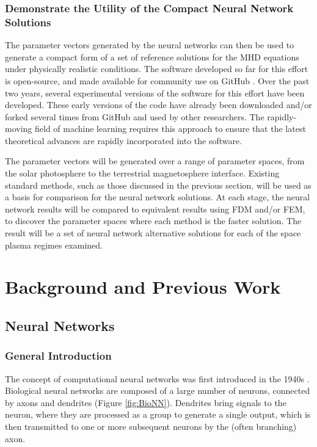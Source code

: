 \documentclass{article}
\begin{document}
\subsubsection{Demonstrate the Utility of the Compact Neural Network Solutions}

 The parameter vectors generated by the neural networks can then be used to generate a compact form of a set of reference solutions for the MHD equations under physically realistic conditions. The software developed so far for this effort \cite{nnode} is open-source, and made available for community use on GitHub \cite{github}. Over the past two years, several experimental versions of the software for this effort have been developed. These early versions of the code have already been downloaded and/or forked several times from GitHub and used by other researchers. The rapidly-moving field of machine learning requires this approach to ensure that the latest theoretical advances are rapidly incorporated into the software.
 
 The parameter vectors will be generated over a range of parameter spaces, from the solar photosphere to the terrestrial magnetosphere interface. Existing standard methods, such as those discussed in the previous section, will be used as a basis for comparison for the neural network solutions. At each stage, the neural network results will be compared to equivalent results using FDM and/or FEM, to discover the parameter spaces where each method is the faster solution. The result will be a set of neural network alternative solutions for each of the space plasma regimes examined.


\newpage

\section{Background and Previous Work}

\subsection{Neural Networks}

\subsubsection{General Introduction}

The concept of computational neural networks was first introduced in the 1940s \cite{McCulloch1943}. Biological neural networks are composed of a large number of neurons, connected by axons and dendrites (Figure \ref{fig:BioNN}). Dendrites bring signals to the neuron, where they are processed as a group to generate a single output, which is then transmitted to  one or more subsequent neurons by the (often branching) axon.
\end{document}
